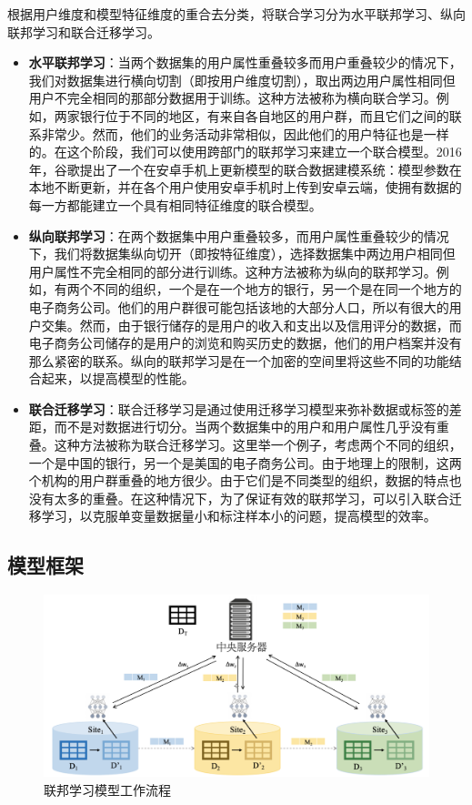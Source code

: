 根据用户维度和模型特征维度的重合去分类，将联合学习分为水平联邦学习、纵向联邦学习和联合迁移学习。
\begin{itemize}
\item \textbf{水平联邦学习}：当两个数据集的用户属性重叠较多而用户重叠较少的情况下，我们对数据集进行横向切割（即按用户维度切割），取出两边用户属性相同但用户不完全相同的那部分数据用于训练。这种方法被称为横向联合学习。例如，两家银行位于不同的地区，有来自各自地区的用户群，而且它们之间的联系非常少。然而，他们的业务活动非常相似，因此他们的用户特征也是一样的。在这个阶段，我们可以使用跨部门的联邦学习来建立一个联合模型。2016年，谷歌提出了一个在安卓手机上更新模型的联合数据建模系统：模型参数在本地不断更新，并在各个用户使用安卓手机时上传到安卓云端，使拥有数据的每一方都能建立一个具有相同特征维度的联合模型。

\item \textbf{纵向联邦学习}：在两个数据集中用户重叠较多，而用户属性重叠较少的情况下，我们将数据集纵向切开（即按特征维度），选择数据集中两边用户相同但用户属性不完全相同的部分进行训练。这种方法被称为纵向的联邦学习。例如，有两个不同的组织，一个是在一个地方的银行，另一个是在同一个地方的电子商务公司。他们的用户群很可能包括该地的大部分人口，所以有很大的用户交集。然而，由于银行储存的是用户的收入和支出以及信用评分的数据，而电子商务公司储存的是用户的浏览和购买历史的数据，他们的用户档案并没有那么紧密的联系。纵向的联邦学习是在一个加密的空间里将这些不同的功能结合起来，以提高模型的性能。

\item \textbf{联合迁移学习}：联合迁移学习是通过使用迁移学习模型来弥补数据或标签的差距，而不是对数据进行切分。当两个数据集中的用户和用户属性几乎没有重叠。这种方法被称为联合迁移学习。这里举一个例子，考虑两个不同的组织，一个是中国的银行，另一个是美国的电子商务公司。由于地理上的限制，这两个机构的用户群重叠的地方很少。由于它们是不同类型的组织，数据的特点也没有太多的重叠。在这种情况下，为了保证有效的联邦学习，可以引入联合迁移学习，以克服单变量数据量小和标注样本小的问题，提高模型的效率。

\end{itemize}

\subsection{模型框架}

\begin{figure}[!hbt]
\centering
	\includegraphics[scale=0.45]{fig2/C2/联邦学习模型流程}%
	\caption{联邦学习模型工作流程}
	\label{fig:联邦学习模型工作流程}	
\end{figure}

